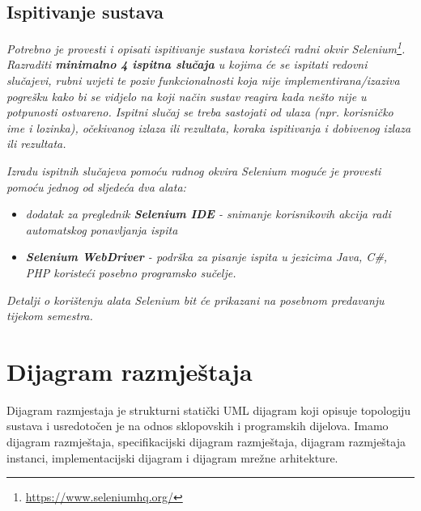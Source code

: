 			
			\subsection{Ispitivanje sustava}
			
			 \textit{Potrebno je provesti i opisati ispitivanje sustava koristeći radni okvir Selenium\footnote{\url{https://www.seleniumhq.org/}}. Razraditi \textbf{minimalno 4 ispitna slučaja} u kojima će se ispitati redovni slučajevi, rubni uvjeti te poziv funkcionalnosti koja nije implementirana/izaziva pogrešku kako bi se vidjelo na koji način sustav reagira kada nešto nije u potpunosti ostvareno. Ispitni slučaj se treba sastojati od ulaza (npr. korisničko ime i lozinka), očekivanog izlaza ili rezultata, koraka ispitivanja i dobivenog izlaza ili rezultata.\\ }
			 
			 \textit{Izradu ispitnih slučajeva pomoću radnog okvira Selenium moguće je provesti pomoću jednog od sljedeća dva alata:}
			 \begin{itemize}
			 	\item \textit{dodatak za preglednik \textbf{Selenium IDE} - snimanje korisnikovih akcija radi automatskog ponavljanja ispita	}
			 	\item \textit{\textbf{Selenium WebDriver} - podrška za pisanje ispita u jezicima Java, C\#, PHP koristeći posebno programsko sučelje.}
			 \end{itemize}
		 	\textit{Detalji o korištenju alata Selenium bit će prikazani na posebnom predavanju tijekom semestra.}
			
			\eject 
		
		
		\section{Dijagram razmještaja}
		
		Dijagram razmjestaja je strukturni statički UML dijagram koji opisuje topologiju sustava i usredotočen je na odnos sklopovskih i programskih dijelova.
		Imamo dijagram razmještaja, specifikacijski dijagram razmještaja, dijagram razmještaja instanci, implementacijski dijagram i dijagram mrežne arhitekture.
			
